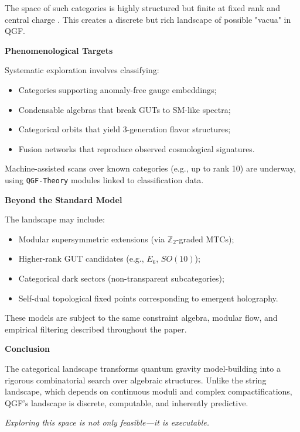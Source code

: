 \documentclass[11pt]{article}
\begin{document}
The space of such categories is highly structured but finite at fixed rank and central charge \cite{Rowell2009}. This creates a discrete but rich landscape of possible "vacua" in QGF.

\vspace{0.5em}
\noindent\textbf{Phenomenological Targets}

Systematic exploration involves classifying:
\begin{itemize}
  \item Categories supporting anomaly-free gauge embeddings;
  \item Condensable algebras that break GUTs to SM-like spectra;
  \item Categorical orbits that yield 3-generation flavor structures;
  \item Fusion networks that reproduce observed cosmological signatures.
\end{itemize}

Machine-assisted scans over known categories (e.g., up to rank 10) are underway, using \texttt{QGF-Theory} modules linked to classification data.

\vspace{0.5em}
\noindent\textbf{Beyond the Standard Model}

The landscape may include:
\begin{itemize}
  \item Modular supersymmetric extensions (via \( \mathbb{Z}_2 \)-graded MTCs);
  \item Higher-rank GUT candidates (e.g., \( E_6 \), \( SO(10) \));
  \item Categorical dark sectors (non-transparent subcategories);
  \item Self-dual topological fixed points corresponding to emergent holography.
\end{itemize}

These models are subject to the same constraint algebra, modular flow, and empirical filtering described throughout the paper.

\vspace{0.5em}
\noindent\textbf{Conclusion}

The categorical landscape transforms quantum gravity model-building into a rigorous combinatorial search over algebraic structures. Unlike the string landscape, which depends on continuous moduli and complex compactifications, QGF’s landscape is discrete, computable, and inherently predictive.

\emph{Exploring this space is not only feasible—it is executable.}
\end{document}
